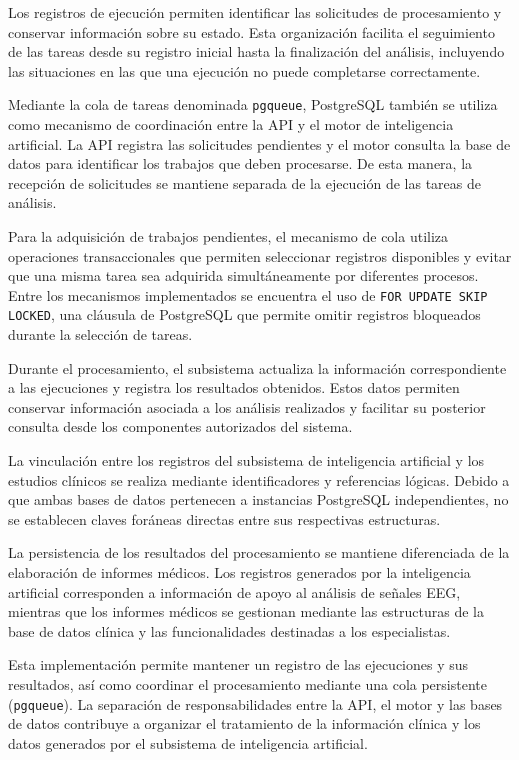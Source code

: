 Los registros de ejecución permiten identificar
las solicitudes de procesamiento y conservar
información sobre su estado. Esta organización
facilita el seguimiento de las tareas desde su
registro inicial hasta la finalización del análisis,
incluyendo las situaciones en las que una ejecución
no puede completarse correctamente.

Mediante la cola de tareas denominada \texttt{pgqueue}, PostgreSQL también se
utiliza como mecanismo de coordinación entre la API
y el motor de inteligencia artificial. La API registra
las solicitudes pendientes y el motor consulta la
base de datos para identificar los trabajos que
deben procesarse. De esta manera, la recepción de
solicitudes se mantiene separada de la ejecución
de las tareas de análisis.

Para la adquisición de trabajos pendientes, el
mecanismo de cola utiliza operaciones transaccionales
que permiten seleccionar registros disponibles y
evitar que una misma tarea sea adquirida
simultáneamente por diferentes procesos. Entre
los mecanismos implementados se encuentra el uso
de \texttt{FOR UPDATE SKIP LOCKED}, una cláusula
de PostgreSQL que permite omitir registros
bloqueados durante la selección de tareas.

Durante el procesamiento, el subsistema actualiza
la información correspondiente a las ejecuciones
y registra los resultados obtenidos. Estos datos
permiten conservar información asociada a los
análisis realizados y facilitar su posterior
consulta desde los componentes autorizados del
sistema.

La vinculación entre los registros del subsistema
de inteligencia artificial y los estudios clínicos
se realiza mediante identificadores y referencias
lógicas. Debido a que ambas bases de datos
pertenecen a instancias PostgreSQL independientes,
no se establecen claves foráneas directas entre
sus respectivas estructuras.

La persistencia de los resultados del procesamiento
se mantiene diferenciada de la elaboración de
informes médicos. Los registros generados por la
inteligencia artificial corresponden a información
de apoyo al análisis de señales EEG, mientras que
los informes médicos se gestionan mediante las
estructuras de la base de datos clínica y las
funcionalidades destinadas a los especialistas.

Esta implementación permite mantener un registro
de las ejecuciones y sus resultados, así como
coordinar el procesamiento mediante una cola
persistente (\texttt{pgqueue}). La separación de responsabilidades
entre la API, el motor y las bases de datos
contribuye a organizar el tratamiento de la
información clínica y los datos generados por
el subsistema de inteligencia artificial.


